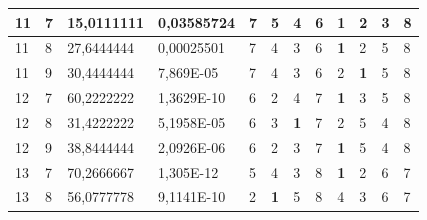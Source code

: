 \documentclass[conference]{IEEEtran}
\begin{document}
\begin{table}[]
\begin{tabular}{|llll|llllllll|}
		\multicolumn{1}{|l|}{11} & \multicolumn{1}{l|}{7} & \multicolumn{1}{l|}{15,0111111} & 0,03585724 & \multicolumn{1}{l|}{7} & \multicolumn{1}{l|}{5} & \multicolumn{1}{l|}{4} & \multicolumn{1}{l|}{6} & \multicolumn{1}{l|}{\textbf{1}} & \multicolumn{1}{l|}{2} & \multicolumn{1}{l|}{3} & 8 \\ \hline
		\multicolumn{1}{|l|}{11} & \multicolumn{1}{l|}{8} & \multicolumn{1}{l|}{27,6444444} & 0,00025501 & \multicolumn{1}{l|}{7} & \multicolumn{1}{l|}{4} & \multicolumn{1}{l|}{3} & \multicolumn{1}{l|}{6} & \multicolumn{1}{l|}{\textbf{1}} & \multicolumn{1}{l|}{2} & \multicolumn{1}{l|}{5} & 8 \\ \hline
		\multicolumn{1}{|l|}{11} & \multicolumn{1}{l|}{9} & \multicolumn{1}{l|}{30,4444444} & 7,869E-05 & \multicolumn{1}{l|}{7} & \multicolumn{1}{l|}{4} & \multicolumn{1}{l|}{3} & \multicolumn{1}{l|}{6} & \multicolumn{1}{l|}{2} & \multicolumn{1}{l|}{\textbf{1}} & \multicolumn{1}{l|}{5} & 8 \\ \hline
		\multicolumn{1}{|l|}{12} & \multicolumn{1}{l|}{7} & \multicolumn{1}{l|}{60,2222222} & 1,3629E-10 & \multicolumn{1}{l|}{6} & \multicolumn{1}{l|}{2} & \multicolumn{1}{l|}{4} & \multicolumn{1}{l|}{7} & \multicolumn{1}{l|}{\textbf{1}} & \multicolumn{1}{l|}{3} & \multicolumn{1}{l|}{5} & 8 \\ \hline
		\multicolumn{1}{|l|}{12} & \multicolumn{1}{l|}{8} & \multicolumn{1}{l|}{31,4222222} & 5,1958E-05 & \multicolumn{1}{l|}{6} & \multicolumn{1}{l|}{3} & \multicolumn{1}{l|}{\textbf{1}} & \multicolumn{1}{l|}{7} & \multicolumn{1}{l|}{2} & \multicolumn{1}{l|}{5} & \multicolumn{1}{l|}{4} & 8 \\ \hline
		\multicolumn{1}{|l|}{12} & \multicolumn{1}{l|}{9} & \multicolumn{1}{l|}{38,8444444} & 2,0926E-06 & \multicolumn{1}{l|}{6} & \multicolumn{1}{l|}{2} & \multicolumn{1}{l|}{3} & \multicolumn{1}{l|}{7} & \multicolumn{1}{l|}{\textbf{1}} & \multicolumn{1}{l|}{5} & \multicolumn{1}{l|}{4} & 8 \\ \hline
		\multicolumn{1}{|l|}{13} & \multicolumn{1}{l|}{7} & \multicolumn{1}{l|}{70,2666667} & 1,305E-12 & \multicolumn{1}{l|}{5} & \multicolumn{1}{l|}{4} & \multicolumn{1}{l|}{3} & \multicolumn{1}{l|}{8} & \multicolumn{1}{l|}{\textbf{1}} & \multicolumn{1}{l|}{2} & \multicolumn{1}{l|}{6} & 7 \\ \hline
		\multicolumn{1}{|l|}{13} & \multicolumn{1}{l|}{8} & \multicolumn{1}{l|}{56,0777778} & 9,1141E-10 & \multicolumn{1}{l|}{2} & \multicolumn{1}{l|}{\textbf{1}} & \multicolumn{1}{l|}{5} & \multicolumn{1}{l|}{8} & \multicolumn{1}{l|}{4} & \multicolumn{1}{l|}{3} & \multicolumn{1}{l|}{6} & 7 \\ \hline

\end{tabular}
\end{table}
\end{document}
